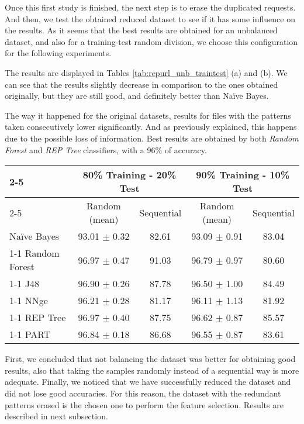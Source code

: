 \documentclass{llncs}
\begin{document}
Once this first study is finished, the next step is to erase the duplicated requests. And then, we test the obtained reduced dataset to see if it has some influence on the results. As it seems that the best results are obtained for an unbalanced dataset, and also for a training-test random division, we choose this configuration for the following experiments.

The results are displayed in Tables \ref{tab:repurl_unb_traintest} (a) and (b). We can see that the results slightly decrease in comparison to the ones obtained originally, but they are still good, and definitely better than Na\"ive Bayes. 

The way it happened for the original datasets, results for files with the patterns taken consecutively lower significantly. And as previously explained, this happens due to the possible loss of information. Best results are obtained by both \textit{Random Forest} and \textit{REP Tree} classifiers, with a 96\% of accuracy.

\begin{table*}[htpb]
\centering
 \caption{\label{tab:repurl_unb_traintest}Percentage of correctly classified patterns for unbalanced data, after the removal of entries that could lead to misclassification.}
{\small
\begin{tabular}{|l|c|c|c|c|}
\cline{2-5}
\multicolumn{1}{l|}{} & \multicolumn{2}{c|}{80\% Training - 20\% Test} & \multicolumn{2}{c|}{90\% Training - 10\% Test} \\
\cline{2-5}
\multicolumn{1}{l|}{} & Random (mean) & Sequential & Random (mean) & Sequential \\
\hline
Na\"ive Bayes & 93.01 $\pm$ 0.32 & 82.61 & 93.09 $\pm$ 0.91 & 83.04 \\
\cline{1-1}
Random Forest & 96.97 $\pm$ 0.47 & 91.03 & 96.79 $\pm$ 0.97 & 80.60 \\
\cline{1-1}
J48 & 96.90 $\pm$ 0.26 & 87.78 & 96.50 $\pm$ 1.00 & 84.49 \\
\cline{1-1}
NNge & 96.21 $\pm$ 0.28 & 81.17 & 96.11 $\pm$ 1.13 & 81.92 \\
\cline{1-1}
REP Tree & 96.97 $\pm$ 0.40 & 87.75 & 96.62 $\pm$ 0.87 & 85.57 \\
\cline{1-1}
PART & 96.84 $\pm$ 0.18 & 86.68 & 96.55 $\pm$ 0.87 & 83.61 \\
\hline
\end{tabular}
}
\end{table*}

First, we concluded that not balancing the dataset was better for obtaining good results, also that taking the samples randomly instead of a sequential way is more adequate. Finally, we noticed that we have successfully reduced the dataset and did not lose good accuracies. For this reason, the dataset with the redundant patterns erased is the chosen one to perform the feature selection. Results are described in next subsection.
\end{document}
